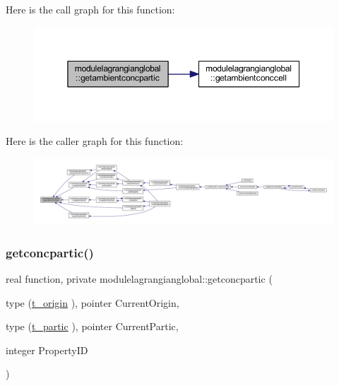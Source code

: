 Here is the call graph for this function\+:\nopagebreak
\begin{figure}[H]
\begin{center}
\leavevmode
\includegraphics[width=350pt]{namespacemodulelagrangianglobal_a48f3a78b845b645d04afad9baa94ac01_cgraph}
\end{center}
\end{figure}
Here is the caller graph for this function\+:\nopagebreak
\begin{figure}[H]
\begin{center}
\leavevmode
\includegraphics[width=350pt]{namespacemodulelagrangianglobal_a48f3a78b845b645d04afad9baa94ac01_icgraph}
\end{center}
\end{figure}
\mbox{\label{namespacemodulelagrangianglobal_a7f334bcd9f4c9e4556c095e5e4ff02b4}} 
\subsubsection{\texorpdfstring{getconcpartic()}{getconcpartic()}}
{\footnotesize\ttfamily real function, private modulelagrangianglobal\+::getconcpartic (\begin{DoxyParamCaption}\item[{type (\mbox{\hyperlink{structmodulelagrangianglobal_1_1t__origin}{t\+\_\+origin}} ), pointer}]{Current\+Origin,  }\item[{type (\mbox{\hyperlink{structmodulelagrangianglobal_1_1t__partic}{t\+\_\+partic}} ), pointer}]{Current\+Partic,  }\item[{integer}]{Property\+ID }\end{DoxyParamCaption})\hspace{0.3cm}{\ttfamily [private]}}

